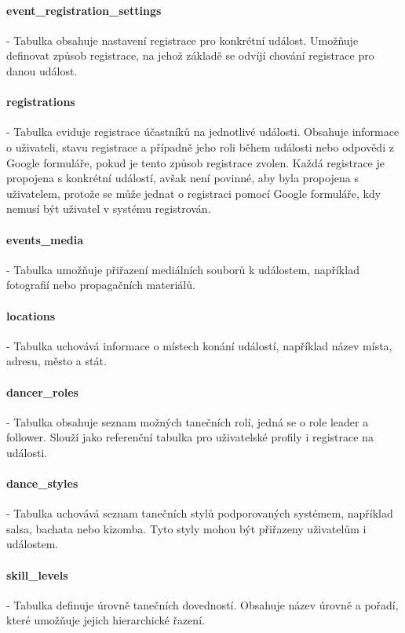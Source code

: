\paragraph{event\_registration\_settings}- Tabulka obsahuje nastavení registrace pro konkrétní událost. 
Umožňuje definovat způsob registrace, na jehož základě se odvíjí chování registrace pro danou událost.

\paragraph{registrations}- Tabulka eviduje registrace účastníků na jednotlivé události. Obsahuje 
informace o uživateli, stavu registrace a případně jeho roli během události nebo 
odpovědi z Google formuláře, pokud je tento způsob registrace zvolen. Každá registrace je propojena s konkrétní událostí, avšak není povinné, aby byla propojena s uživatelem, protože se může jednat o registraci pomocí Google formuláře, kdy nemusí být uživatel v systému registrován.

\paragraph{events\_media}- Tabulka umožňuje přiřazení mediálních souborů k událostem, například 
fotografií nebo propagačních materiálů.

\paragraph{locations}- Tabulka uchovává informace o místech konání událostí, například název místa, 
adresu, město a stát.

\paragraph{dancer\_roles}- Tabulka obsahuje seznam možných tanečních rolí, jedná se o role leader a follower. Slouží jako referenční tabulka pro uživatelské profily i registrace na události.

\paragraph{dance\_styles}- Tabulka uchovává seznam tanečních stylů podporovaných systémem, například 
salsa, bachata nebo kizomba. Tyto styly mohou být přiřazeny uživatelům i událostem.

\paragraph{skill\_levels}- Tabulka definuje úrovně tanečních dovedností. Obsahuje název úrovně a 
pořadí, které umožňuje jejich hierarchické řazení.

